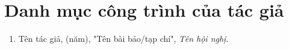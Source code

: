 \chapter*{Danh mục công trình của tác giả}
\label{Appendix1}

\begin{enumerate}
\item Tên tác giả, (năm), "Tên bài báo/tạp chí", \textit{Tên hội nghị}.
\end{enumerate}